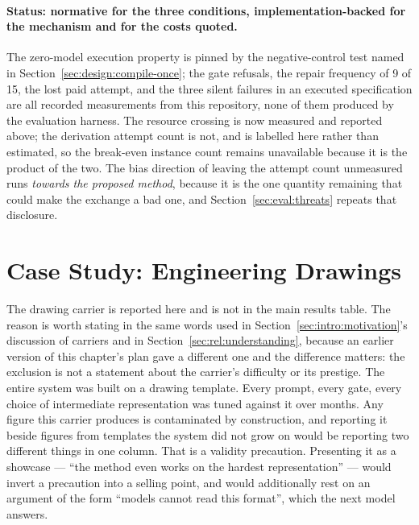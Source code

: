 \paragraph{Status: normative for the three conditions, implementation-backed for the mechanism
and for the costs quoted.}
The zero-model execution property is pinned by the negative-control test named in
Section~\ref{sec:design:compile-once}; the gate refusals, the repair frequency of 9 of 15, the
lost paid attempt, and the three silent failures in an executed specification are all recorded
measurements from this repository, none of them produced by the evaluation harness. The
resource crossing is now measured and reported above; the derivation attempt count is not, and
is labelled here rather than estimated, so the break-even instance count remains unavailable
because it is the product of the two. The bias direction of leaving the attempt count
unmeasured runs \emph{towards the proposed method}, because it is the one quantity remaining
that could make the exchange a bad one, and Section~\ref{sec:eval:threats} repeats that
disclosure.

\section{Case Study: Engineering Drawings}
\label{sec:eval:dwg}


The drawing carrier is reported here and is not in the main results table. The reason is worth
stating in the same words used in Section~\ref{sec:intro:motivation}'s discussion of carriers and
in Section~\ref{sec:rel:understanding}, because an earlier version of this chapter's plan gave
a different one and the difference matters: the exclusion is not a statement about the
carrier's difficulty or its prestige. The entire system was built on a drawing template. Every
prompt, every gate, every choice of intermediate representation was tuned against it over
months. Any figure this carrier produces is contaminated by construction, and reporting it
beside figures from templates the system did not grow on would be reporting two different
things in one column. That is a validity precaution. Presenting it as a showcase --- ``the
method even works on the hardest representation'' --- would invert a precaution into a selling
point, and would additionally rest on an argument of the form ``models cannot read this
format'', which the next model answers.

